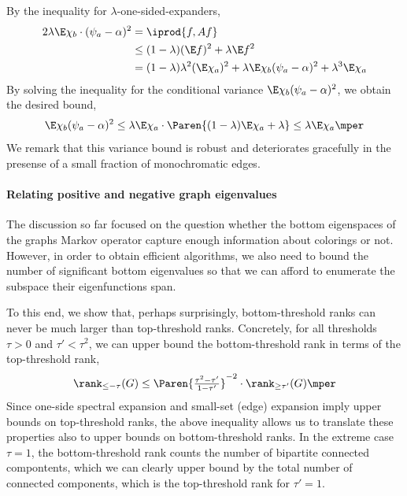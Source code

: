 By the inequality for \(\lambda\)-one-sided-expanders,
\begin{align}
    2\lambda \E \chi_{b} \cdot(\psi_{a}-\alpha)^{2}
    & = \iprod{f,Af} \\
    & \le (1-\lambda) (\E f)^{2} + \lambda \E f^{2} \\
    & =   (1-\lambda) \lambda^{2} (\E \chi_{a})^{2} + \lambda \E \chi_{b} (\psi_{a}-\alpha)^{2} + \lambda^{3} \E \chi_{a}
\end{align}
By solving the inequality for the conditional variance \(\E \chi_{b}(\psi_{a}-\alpha)^{2}\),
we obtain the desired bound,
\begin{equation}
  \E\chi_{b}(\psi_{a}-\alpha)^{2}
  \le \lambda \E \chi_{a} \cdot \Paren{(1-\lambda)\E \chi_{a}+\lambda}\le \lambda \E \chi_{a}
  \mper
\end{equation}
We remark that this variance bound is robust and deteriorates gracefully in the presense of a small fraction of monochromatic edges.

\paragraph{Relating positive and negative graph eigenvalues} 

The discussion so far focused on the question whether the bottom eigenspaces of the graphs Markov operator capture enough information about colorings or not.
However, in order to obtain efficient algorithms, we also need to bound the number of significant bottom eigenvalues so that we can afford to enumerate the subspace their eigenfunctions span.

To this end, we show that, perhaps surprisingly, bottom-threshold ranks can never be much larger than top-threshold ranks.
Concretely, for all thresholds \(\tau>0\) and \(\tau'<\tau^{2}\), we can upper bound the bottom-threshold rank in terms of the top-threshold rank,
\begin{equation}
  \rank_{\le -\tau}(G)\le \Paren{\tfrac{\tau^{2}-\tau'}{1-\tau'}}^{-2}\cdot \rank_{\ge \tau'}(G)
  \mper
\end{equation}
Since one-side spectral expansion and small-set (edge) expansion imply upper bounds on top-threshold ranks, the above inequality allows us to translate these properties also to upper bounds on bottom-threshold ranks.
In the extreme case \(\tau=1\), the bottom-threshold rank counts the number of bipartite connected compontents, which we can clearly upper bound by the total number of connected components, which is the top-threshold rank for \(\tau'=1\).

